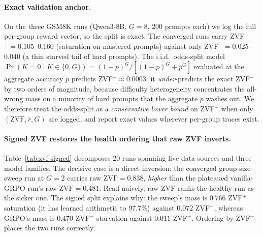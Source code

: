 \paragraph{Exact validation anchor.}
On the three GSM8K runs (Qwen3-8B, $G{=}8$, 200 prompts each) we log the
full per-group reward vector, so the split is exact. The converged runs
carry ZVF$^+{=}0.105$--$0.160$ (saturation on mastered prompts) against
only ZVF$^-{=}0.025$--$0.040$ (a thin starved tail of hard prompts). The
i.i.d.\ odds-split model $\Pr(K{=}0\mid K{\in}\{0,G\})=(1{-}p)^G/[(1{-}p)^G{+}p^G]$
evaluated at the aggregate accuracy $p$ predicts ZVF$^-{\approx}0.0003$:
it \emph{under}-predicts the exact ZVF$^-$ by two orders of magnitude,
because difficulty heterogeneity concentrates the all-wrong mass on a
minority of hard prompts that the aggregate $p$ washes out. We therefore
treat the odds-split as a \emph{conservative lower bound} on ZVF$^-$ when
only $(\mathrm{ZVF},\bar r,G)$ are logged, and report exact values wherever
per-group traces exist.

\paragraph{Signed ZVF restores the health ordering that raw ZVF inverts.}
Table~\ref{tab:zvf-signed} decomposes 20 runs spanning five data sources
and three model families. The decisive case is a direct inversion: the
converged group-size-sweep run at $G{=}2$ carries raw
$\mathrm{ZVF}{=}0.838$, \emph{higher} than the plateaued vanilla-GRPO
run's raw $\mathrm{ZVF}{=}0.481$. Read naively, raw ZVF ranks the healthy
run as the sicker one. The signed split explains why: the sweep's mass is
$0.766$ ZVF$^+$ saturation (it has learned arithmetic to $97.7\%$) against
$0.072$ ZVF$^-$, whereas GRPO's mass is $0.470$ ZVF$^-$ starvation against
$0.011$ ZVF$^+$. Ordering by ZVF$^-$ places the two runs correctly.

